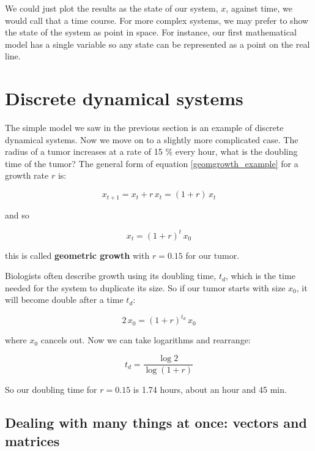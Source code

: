 \documentclass{tufte-book} %
\begin{document}
 We could just plot the results as the state of our system, $x$, against time, we would call that a time course. For more complex systems, we may prefer to show the state of the system as point in space. For instance, our first mathematical model has a single variable so any  state can be represented as a point on the real line.

\chapter{Discrete dynamical systems}

The simple model we saw in the previous section is an example of discrete dynamical systems. Now we move on to a slightly more complicated case. The radius of a tumor increases at a rate of  15 \% every hour, what is the doubling time of the tumor? The general form of equation \ref{geomgrowth_example} for a growth rate $r$ is:

\begin{equation}
\label{geomgrowth_general}
x_{t+1} = x_t  + r \, x_t =(1 + r) \, x_t
\end{equation}

and so

\begin{equation}
\label{geomgrowth_general2}
x_{t} = (1 + r)^{t} \, x_0
\end{equation}


this is called \textbf{geometric growth} with $r=0.15$ for our tumor. 



Biologists often describe growth using its doubling time, $t_d$,  which is the time needed for the system to duplicate its size. So if our tumor starts with size $x_0$, it will become double after a time $t_d$:

\begin{equation}
2\, x_{0} = (1 + r)^{t_d} \, x_0
\end{equation}

where $x_0$ cancels out. Now we can take  logarithms and rearrange:

\begin{equation}
t_d = \frac{\log 2}{\log (1 + r) }
\end{equation}

So our doubling time for $r=0.15$ is 1.74 hours, about an hour and 45 min.

\section{Dealing with many things at once: vectors and matrices}
\end{document}
